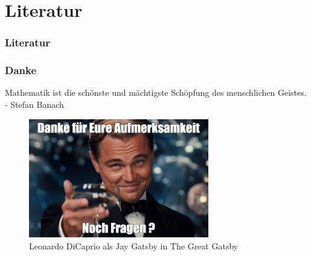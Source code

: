 \documentclass[t, handout]{beamer}
\theoremstyle{definition} %
\begin{document}
\section{Literatur}

\begin{frame}
\frametitle{Literatur}
\printbibliography[heading=none, type=book]
\end{frame}

\begin{frame}
\frametitle{Danke}

{\large \glqq Mathematik ist die schönste und mächtigste Schöpfung des menschlichen Geistes.\grqq \: -\:  Stefan Banach \par}
\vspace{0.5cm}
\pause

\centering
\begin{figure}
\includegraphics[width=0.7\textwidth]{pictures/leonardo-meme.png}
\caption{Leonardo DiCaprio als Jay Gatsby in The Great Gatsby \cite{LeonardoMeme}}
\end{figure}

\end{frame}
\end{document}
